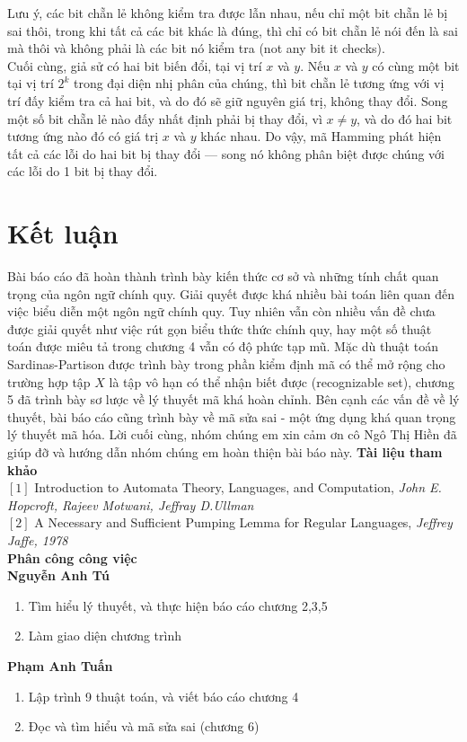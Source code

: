 \documentclass[14pt]{extreport}
\begin{document}
Lưu ý, các bit chẵn lẻ không kiểm tra được lẫn nhau, nếu chỉ một bit chẵn lẻ bị sai thôi, trong khi tất cả các bit khác là đúng, thì chỉ có bit chẵn lẻ nói đến là sai mà thôi và không phải là các bit nó kiểm tra (not any bit it checks).\\

Cuối cùng, giả sử có hai bit biến đổi, tại vị trí $x$ và $y$. Nếu $x$ và $y$ có cùng một bit tại vị trí $2^k$ trong đại diện nhị phân của chúng, thì bit chẵn lẻ tương ứng với vị trí đấy kiểm tra cả hai bit, và do đó sẽ giữ nguyên giá trị, không thay đổi. Song một số bit chẵn lẻ nào đấy nhất định phải bị thay đổi, vì $x \ne y$, và do đó hai bit tương ứng nào đó có giá trị $x$ và $y$ khác nhau. Do vậy, mã Hamming phát hiện tất cả các lỗi do hai bit bị thay đổi — song nó không phân biệt được chúng với các lỗi do 1 bit bị thay đổi.


\chapter{Kết luận}
Bài báo cáo đã hoàn thành trình bày kiến thức cơ sở và những tính chất quan trọng của ngôn ngữ chính quy. Giải quyết được khá nhiều bài toán liên quan đến việc biểu diễn một ngôn ngữ chính quy. Tuy nhiên vẫn còn nhiều vấn đề chưa được giải quyết như việc rút gọn biểu thức thức chính quy, hay một số thuật toán được miêu tả trong chương 4 vẫn có độ phức tạp mũ. Mặc dù thuật toán Sardinas-Partison được trình bày trong phần kiểm định mã có thể mở rộng cho trường hợp tập $X$ là tập vô hạn có thể nhận biết được (recognizable set), chương 5 đã trình bày sơ lược về lý thuyết mã khá hoàn chỉnh. Bên cạnh các vấn đề về lý thuyết, bài báo cáo cũng trình bày về mã sửa sai - một ứng dụng khá quan trọng lý thuyết mã hóa.
Lời cuối cùng, nhóm chúng em xin cảm ơn cô Ngô Thị Hiền đã giúp đỡ và hướng dẫn nhóm chúng em hoàn thiện bài báo này.
\newpage
{\huge \textbf{Tài liệu tham khảo}} \\
$\left[ 1 \right] $ Introduction to Automata Theory, Languages, and Computation, \textit{John E. Hopcroft, Rajeev Motwani, Jeffray D.Ullman} \\
$\left[ 2 \right] $ A Necessary and Sufficient Pumping Lemma for Regular Languages, \textit{Jeffrey Jaffe, 1978} \\ [2.5cm]

{\Large \textbf{Phân công công việc}} \\

\textbf{Nguyễn Anh Tú}
\begin{enumerate}
\item Tìm hiểu lý thuyết, và thực hiện báo cáo chương 2,3,5
\item Làm giao diện chương trình
\end{enumerate}

\textbf{Phạm Anh Tuấn} 
\begin{enumerate}
\item Lập trình 9 thuật toán, và viết báo cáo chương 4
\item Đọc và tìm hiểu và mã sửa sai (chương 6)

\newpage
\end{enumerate}
\end{document}

